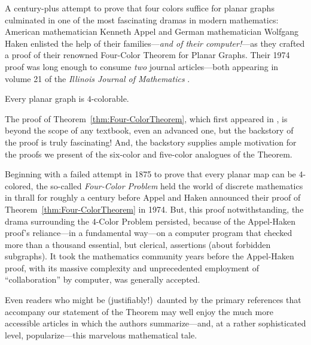 A century-plus attempt to prove that four colors suffice for planar graphs culminated in one of the most fascinating dramas in modern mathematics:  American mathematician Kenneth Appel and German mathematician Wolfgang Haken enlisted the help of their families---{\em and of their computer!}---as they crafted a proof of their renowned Four-Color Theorem for Planar Graphs.  Their 1974 proof was long enough to consume {\em two} journal articles---both appearing in volume 21 of the {\it Illinois Journal of Mathematics} \cite{AppelH77a,AppelH77b}.


\begin{theorem}
\label{thm:Four-ColorTheorem}
Every planar graph is $4$-colorable.
\end{theorem}


The proof of Theorem~\ref{thm:Four-ColorTheorem}, which first appeared
in \cite{AppelH77a,AppelH77b}, is beyond the scope of any textbook, even an advanced one, but the backstory of the proof is truly fascinating!  And, the backstory supplies ample motivation for the proofs we present of the six-color and five-color analogues of the Theorem.

\medskip

Beginning with a failed attempt in 1875 to prove that every planar map can be $4$-colored, the so-called {\it Four-Color Problem} held the world of discrete mathematics in thrall for roughly a century before Appel and Haken announced their proof of 
Theorem~\ref{thm:Four-ColorTheorem} in 1974.  But, this proof notwithstanding, the drama surrounding the $4$-Color Problem persisted, because of the Appel-Haken proof's reliance---in a fundamental way---on a computer program that checked more than a thousand essential, but clerical, assertions (about forbidden subgraphs).  It took the mathematics community years before the Appel-Haken proof, with its massive complexity and unprecedented employment of ``collaboration'' by computer, was generally accepted.

\smallskip

Even readers who might be (justifiably!)~daunted by the primary references \cite{AppelH77a,AppelH77b} that accompany our statement of the Theorem may well enjoy the much more accessible articles \cite{AppelH77c,AppelH89} in which the authors summarize---and, at a rather sophisticated level, popularize---this marvelous mathematical tale.

